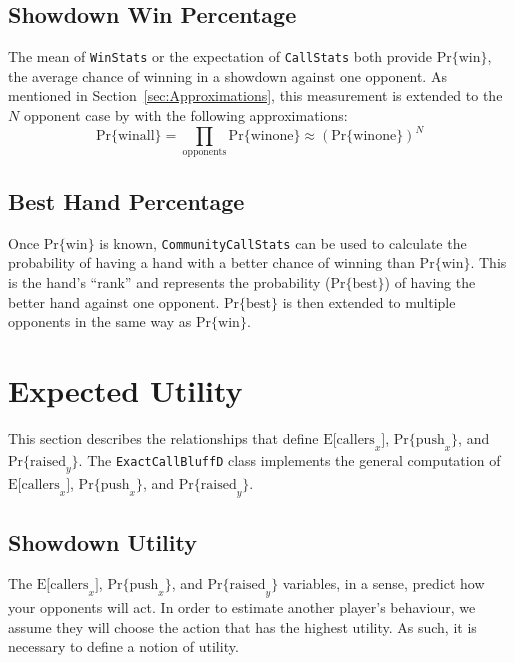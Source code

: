 

\subsection{Showdown Win Percentage}
\label{sec:Mean}
The mean of \texttt{WinStats} or the expectation of \texttt{CallStats} both provide $\mathrm{Pr\{win\}}$, the average chance of winning in a showdown against one opponent.
As mentioned in Section~\ref{sec:Approximations}, this measurement is extended to the $N$ opponent case by with the following approximations:
\[
\mathrm{Pr\{win all\}} = \prod_\mathrm{opponents} \mathrm{Pr\{win one\}} \approx \left( \mathrm{Pr\{win one\}} \right)^N
\]


\subsection{Best Hand Percentage}
\label{sec:Rank}
Once $\mathrm{Pr\{win\}}$ is known, \texttt{CommunityCallStats} can be used to calculate the probability of having a hand with a better chance of winning than $\mathrm{Pr\{win\}}$.
This is the hand's ``rank'' and represents the probability ($\mathrm{Pr\{best\}}$) of having the better hand against one opponent.
$\mathrm{Pr\{best\}}$ is then extended to multiple opponents in the same way as $\mathrm{Pr\{win\}}$.


\section{Expected Utility}

This section describes the relationships that define $\mathrm{E[callers}_x]$, $\mathrm{Pr\{push}_x\}$, and $\mathrm{Pr\{raised}_y\}$.
The \texttt{ExactCallBluffD} class implements the general computation of $\mathrm{E[callers}_x]$, $\mathrm{Pr\{push}_x\}$, and $\mathrm{Pr\{raised}_y\}$.

\subsection{Showdown Utility}
\label{sec:Utility}
The $\mathrm{E[callers}_x]$, $\mathrm{Pr\{push}_x\}$, and $\mathrm{Pr\{raised}_y\}$ variables, in a sense, predict how your opponents will act.
In order to estimate another player's behaviour, we assume they will choose the action that has the highest utility.
As such, it is necessary to define a notion of utility.

